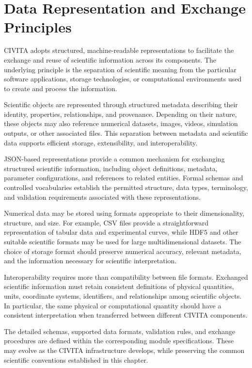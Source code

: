 \section{Data Representation and Exchange Principles}

CIVITA adopts structured, machine-readable representations to facilitate the exchange and reuse of scientific information across its components. The underlying principle is the separation of scientific meaning from the particular software applications, storage technologies, or computational environments used to create and process the information.

Scientific objects are represented through structured metadata describing their identity, properties, relationships, and provenance. Depending on their nature, these objects may also reference numerical datasets, images, videos, simulation outputs, or other associated files. This separation between metadata and scientific data supports efficient storage, extensibility, and interoperability.

JSON-based representations provide a common mechanism for exchanging structured scientific information, including object definitions, metadata, parameter configurations, and references to related entities. Formal schemas and controlled vocabularies establish the permitted structure, data types, terminology, and validation requirements associated with these representations.

Numerical data may be stored using formats appropriate to their dimensionality, structure, and size. For example, CSV files provide a straightforward representation of tabular data and experimental curves, while HDF5 and other suitable scientific formats may be used for large multidimensional datasets. The choice of storage format should preserve numerical accuracy, relevant metadata, and the information necessary for scientific interpretation.

Interoperability requires more than compatibility between file formats. Exchanged scientific information must retain consistent definitions of physical quantities, units, coordinate systems, identifiers, and relationships among scientific objects. In particular, the same physical or computational quantity should have a consistent interpretation when transferred between different CIVITA components.

The detailed schemas, supported data formats, validation rules, and exchange procedures are defined within the corresponding module specifications. These may evolve as the CIVITA infrastructure develops, while preserving the common scientific conventions established in this chapter.




